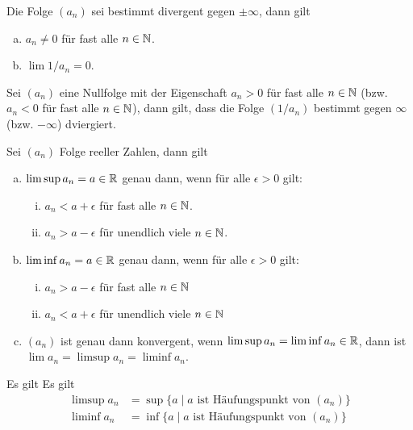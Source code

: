     \begin{satz}
        Die Folge $(a_n)$ sei bestimmt divergent gegen $\pm \infty$, dann gilt
        \begin{enumerate}[(a)]
            \item $a_n\neq 0$ für fast alle $n\in \mathbb{N}$.
            \item $\lim 1/a_n = 0$.
        \end{enumerate}
    \end{satz}
    \begin{satz}
        Sei $(a_n)$ eine Nullfolge mit der Eigenschaft $a_n>0$ für fast alle $n\in \mathbb{N}$ (bzw. $a_n<0$ für fast alle $n\in \mathbb{N}$), dann gilt, dass die Folge $(1/a_n)$ bestimmt gegen $\infty$ (bzw. $-\infty$) dviergiert.
    \end{satz}
    \begin{satz}
        Sei $(a_n)$ Folge reeller Zahlen, dann gilt 
        \begin{enumerate}[(a)]
            \item $\limsup a_n = a\in \mathbb{R}$ genau dann, wenn für alle $\epsilon>0$ gilt:
            \begin{enumerate}[(i)]
                \item $a_n < a+\epsilon$ für fast alle $n\in \mathbb{N}$.
                \item $a_n > a-\epsilon$ für unendlich viele $n\in \mathbb{N}$.
            \end{enumerate}
            \item $\liminf a_n = a\in \mathbb{R}$ genau dann, wenn für alle $\epsilon>0$ gilt:
            \begin{enumerate}[(i)]
                \item $a_n > a-\epsilon$ für fast alle $n\in \mathbb{N}$
                \item $a_n < a+\epsilon$ für unendlich viele $n\in \mathbb{N}$
            \end{enumerate}
            \item $(a_n)$ ist genau dann konvergent, wenn $\limsup a_n = \liminf a_n \in \mathbb{R}$, dann ist $\lim a_n = \limsup a_n = \liminf a_n$.
        \end{enumerate}
    \end{satz}
    \begin{kor}
        Es gilt 
        Es gilt
        \begin{align*}
            \limsup a_n &= \sup \{a\mid a \text{ ist Häufungspunkt von } (a_n) \} \\
            \liminf a_n &= \inf \{a\mid a \text{ ist Häufungspunkt von } (a_n) \} 
        \end{align*}
    \end{kor}